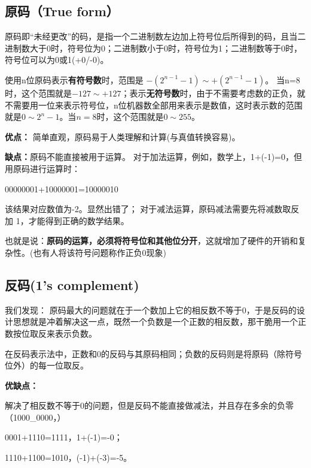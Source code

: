 \begin{issues}
\issueDraft
\end{issues}

\subsection{原码（True form）}

原码即“未经更改”的码，是指一个二进制数左边加上符号位后所得到的码，且当二进制数大于0时，符号位为0；二进制数小于0时，符号位为1；二进制数等于0时，符号位可以为0或1(+0/-0)。

使用n位原码表示\textbf{有符号数}时，范围是 $-(2^{n-1}-1)\sim +(2^{n-1}-1)$。 当n=8时，这个范围就是$-127\sim +127 $；表示\textbf{无符号数}时，由于不需要考虑数的正负，就不需要用一位来表示符号位，n位机器数全部用来表示是数值，这时表示数的范围就是$0\sim 2^{n}-1$。当$n=8$时，这个范围就是$0\sim 255$。


\textbf{优点：}
简单直观，原码易于人类理解和计算(与真值转换容易)。

\textbf{缺点：}原码不能直接被用于运算。
对于加法运算，例如，数学上，1+(-1)=0，但用原码进行运算时：


\begin{example}{}
00000001+10000001=10000010
\end{example}


该结果对应数值为-2。显然出错了；
对于减法运算，原码减法需要先将减数取反加 1，才能得到正确的数学结果。

也就是说：\textbf{原码的运算，必须将符号位和其他位分开}，这就增加了硬件的开销和复杂性。(也有人将该符号问题称作正负0现象)


\subsection{反码(1's complement)}

我们发现：
原码最大的问题就在于一个数加上它的相反数不等于0，于是反码的设计思想就是冲着解决这一点，既然一个负数是一个正数的相反数，那干脆用一个正数按位取反来表示负数。

在反码表示法中，正数和0的反码与其原码相同；负数的反码则是将原码（除符号位外）的每一位取反。

\textbf{优缺点：}

解决了相反数不等于0的问题，但是反码不能直接做减法，并且存在多余的负零 （1000_0000，）
\begin{example}{}
0001+1110=1111，1+(-1)=-0；

1110+1100=1010，(-1)+(-3)=-5。
\end{example}




